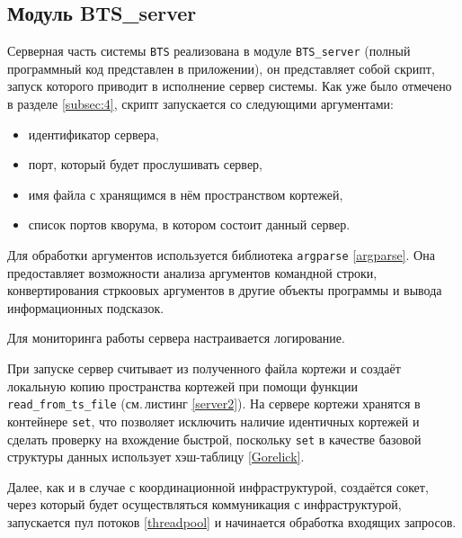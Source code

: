 \subsection{Модуль BTS\_server}\label{subsec:5}
Серверная часть системы \texttt{BTS} реализована в модуле \texttt{BTS_server} (полный программный код представлен в приложении), он представляет собой скрипт, запуск которого приводит в исполнение сервер системы. Как уже было отмечено в разделе \ref{subsec:4}, скрипт запускается со следующими аргументами:
\begin{itemize}
	\item идентификатор сервера,
	\item порт, который будет прослушивать сервер,
	\item имя файла с хранящимся в нём пространством кортежей,
	\item список портов кворума, в котором состоит данный сервер.
\end{itemize}
Для обработки аргументов используется библиотека \texttt{argparse} \ref{argparse}. Она предоставляет возможности анализа аргументов командной строки, конвертирования стркоовых аргументов в другие объекты программы и вывода информационных подсказок.

Для мониторинга работы сервера настраивается логирование.

При запуске сервер считывает из полученного файла кортежи и создаёт локальную копию пространства кортежей при помощи функции \texttt{read_from_ts_file} (см.\,листинг \ref{server2}). На сервере кортежи хранятся в контейнере \texttt{set}, что позволяет исключить наличие идентичных кортежей и сделать проверку на вхождение быстрой, поскольку \texttt{set} в качестве базовой структуры данных использует хэш-таблицу \ref{Gorelick}.

Далее, как и в случае с координационной инфраструктурой, создаётся сокет, через который будет осуществляться коммуникация с инфраструктурой, запускается пул потоков \ref{threadpool} и начинается обработка входящих запросов.

